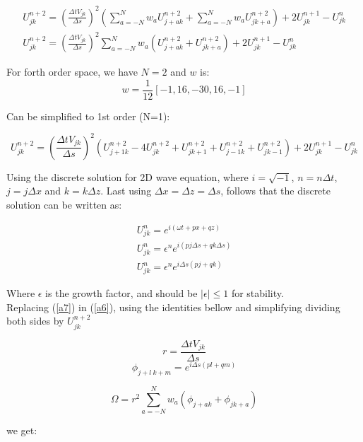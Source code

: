 \documentclass[legalpaper, 12pt]{article}
\begin{document}
\begin{multline}
U_{jk}^{n+2}  =  \left( \frac{\Delta t  V_{jk} }{\Delta s} \right) ^2 \left(  \sum_{a=-N}^N w_a U_{j+a k}^{n+2} + \sum_{a=-N}^N w_a U_{j k+a}^{n+2} \right) + 2 U_{jk}^{n+1} - U_{jk}^n  \\
U_{jk}^{n+2}  =  \left( \frac{\Delta t  V_{jk}}{\Delta s} \right) ^2  \sum_{a=-N}^N  w_a \left( U_{j+a k}^{n+2} + U_{j k+a}^{n+2} \right) + 2 U_{jk}^{n+1} - U_{jk}^n \label{a6}
\end{multline}

For forth order space, we have $N=2$ and $w$ is:
$$ w = \frac{1}{12} [-1, 16, -30, 16, -1] $$

Can be simplified to 1st order (N=1):

\begin{equation}
U_{jk}^{n+2}  =  \left( \frac{\Delta t  V_{jk}}{\Delta s} \right) ^2 \left(  U_{j+1k}^{n+2} - 4 U_{jk}^{n+2} + U_{jk+1}^{n+2} + U_{j-1k}^{n+2} + U_{jk-1}^{n+2}  \right) + 2 U_{jk}^{n+1} - U_{jk}^{n} \nonumber
\end{equation}


Using the discrete solution for 2D wave equation, where $ i = \sqrt{-1} $, $ n = n \Delta t $, $ j = j \Delta x $ and $ k = k \Delta z $. Last using $ \Delta x = \Delta z = \Delta s $, follows that the discrete solution can be written as:

\begin{eqnarray}
U_{jk}^n = e^{i \left( \omega t + px + qz \right)} \nonumber \\
U_{jk}^n = \epsilon^n e^{i \left( pj\Delta s + qk\Delta s \right)}  \nonumber \\
U_{jk}^n = \epsilon^n e^{i \Delta s \left( pj + qk \right)}  \label{a7}
\end{eqnarray}

Where $\epsilon $ is the growth factor, and should be $ |\epsilon| \leq 1$ for stability. \\

Replacing (\ref{a7}) in (\ref{a6}), using the identities bellow and simplifying dividing both sides by $ U_{jk}^{n+2} $

$$ r = \frac{\Delta t  V_{jk}}{\Delta s} $$
$$ \phi_{j+l\ k+m} = e^{i \Delta s \left( pl+qm \right)} $$

\begin{equation}
\Omega = r^2 \sum_{a=-N}^N  w_a \left( \phi_{j+a k} + \phi_{j k+a}  \right) \label{a8}
\end{equation}

we get:
\end{document}
